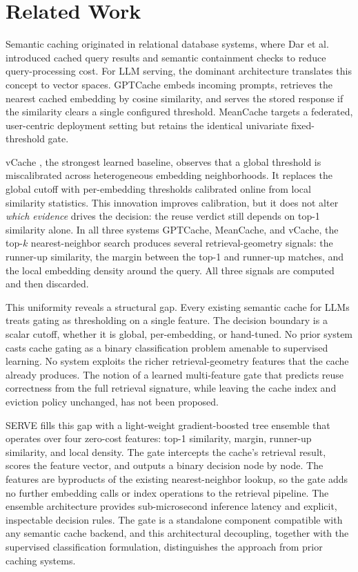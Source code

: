 \section{Related Work}

Semantic caching originated in relational database systems, where Dar et
al.~\cite{dar1996semantic} introduced cached query results and semantic
containment checks to reduce query-processing cost. For LLM serving, the
dominant architecture translates this concept to vector spaces. GPTCache
\cite{bang2023gptcache} embeds incoming prompts, retrieves the nearest
cached embedding by cosine similarity, and serves the stored response if
the similarity clears a single configured threshold. MeanCache
\cite{gill2025meancache} targets a federated, user-centric deployment
setting but retains the identical univariate fixed-threshold gate.

vCache \cite{schroeder2026vcache}, the strongest learned baseline,
observes that a global threshold is miscalibrated across heterogeneous
embedding neighborhoods. It replaces the global cutoff with per-embedding
thresholds calibrated online from local similarity statistics. This
innovation improves calibration, but it does not alter \emph{which
evidence} drives the decision: the reuse verdict still depends on top-1
similarity alone. In all three systems GPTCache, MeanCache, and vCache,
the top-$k$ nearest-neighbor search produces several retrieval-geometry
signals: the runner-up similarity, the margin between the top-1 and
runner-up matches, and the local embedding density around the query. All
three signals are computed and then discarded.

This uniformity reveals a structural gap. Every existing semantic cache
for LLMs treats gating as thresholding on a single feature. The decision
boundary is a scalar cutoff, whether it is global, per-embedding, or
hand-tuned. No prior system casts cache gating as a binary classification
problem amenable to supervised learning. No system exploits the richer
retrieval-geometry features that the cache already produces. The notion
of a learned multi-feature gate that predicts reuse correctness from the
full retrieval signature, while leaving the cache index and eviction
policy unchanged, has not been proposed.

SERVE fills this gap with a light-weight gradient-boosted tree ensemble
that operates over four zero-cost features: top-1 similarity, margin,
runner-up similarity, and local density. The gate intercepts the cache's
retrieval result, scores the feature vector, and outputs a binary decision
node by node. The features are byproducts of the existing nearest-neighbor
lookup, so the gate adds no further embedding calls or index operations to
the retrieval pipeline. The ensemble architecture provides sub-microsecond
inference latency and explicit, inspectable decision rules. The gate is a
standalone component compatible with any semantic cache backend, and
this architectural decoupling, together with the supervised classification
formulation, distinguishes the approach from prior caching systems.

